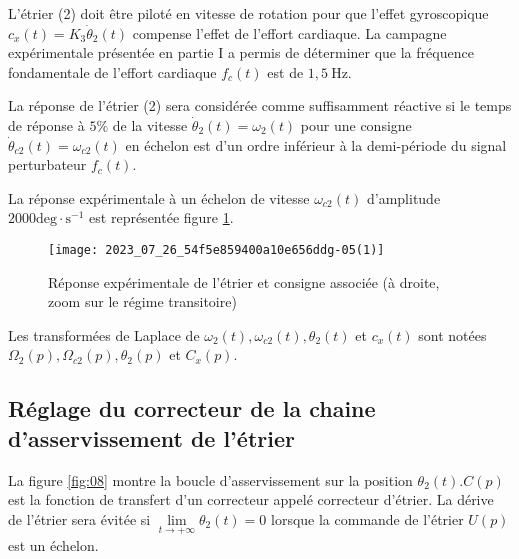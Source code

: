 L'étrier (2) doit être piloté en vitesse de rotation pour que l'effet gyroscopique $c_{x}(t)=K_{3} \dot{\theta}_{2}(t)$ compense l'effet de l'effort cardiaque. La campagne expérimentale présentée en partie I a permis de déterminer que la fréquence fondamentale de l'effort cardiaque $f_{c}(t)$ est de $1,5 \mathrm{~Hz}$.

La réponse de l'étrier (2) sera considérée comme suffisamment réactive si le temps de réponse à $5 \%$ de la vitesse $\dot{\theta}_{2}(t)=\omega_{2}(t)$ pour une consigne $\dot{\theta}_{c 2}(t)=\omega_{c 2}(t)$ en échelon est d'un ordre inférieur à la demi-période du signal perturbateur $f_{c}(t)$.

La réponse expérimentale à un échelon de vitesse $\omega_{c 2}(t)$ d'amplitude $2000 \mathrm{deg} \cdot \mathrm{s}^{-1}$ est représentée figure \ref{fig:07}.

\begin{figure}[!h]
\centering
\texttt{[image: 2023\_07\_26\_54f5e859400a10e656ddg-05(1)]}
\caption{\label{fig:07}Réponse expérimentale de l'étrier et consigne associée (à droite, zoom sur le régime transitoire)}
\end{figure}

Les transformées de Laplace de $\omega_{2}(t), \omega_{c 2}(t), \theta_{2}(t)$ et $c_{x}(t)$ sont notées $\Omega_{2}(p), \Omega_{c 2}(p), \theta_{2}(p)$ et $C_{x}(p)$.


\subsection{\label{sec:II.B} Réglage du correcteur de la chaine d'asservissement de l'étrier}
La figure \ref{fig:08} montre la boucle d'asservissement sur la position $\theta_{2}(t) . C(p)$ est la fonction de transfert d'un correcteur appelé correcteur d'étrier. La dérive de l'étrier sera évitée si $\lim\limits_{t \rightarrow+\infty} \theta_{2}(t)=0$ lorsque la commande de l'étrier $U(p)$ est un échelon.

